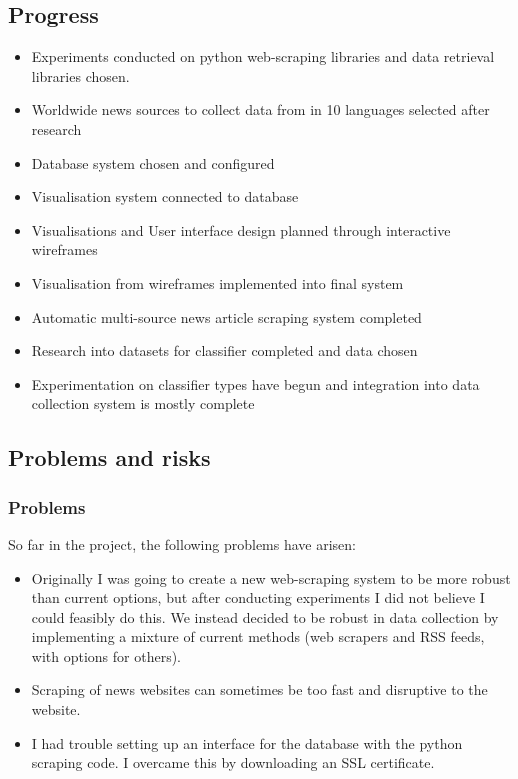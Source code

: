 \documentclass[11pt]{article}
\begin{document}
\subsection{Progress}\label{progress}
\begin{itemize}
    \tightlist
\item  Experiments conducted on python web-scraping libraries and data retrieval libraries chosen.
\item  Worldwide news sources to collect data from in 10 languages selected after research
\item  Database system chosen and configured
\item  Visualisation system connected to database
\item  Visualisations and User interface design planned through interactive wireframes
\item  Visualisation from wireframes implemented into final system
\item  Automatic multi-source news article scraping system completed
\item  Research into datasets for classifier completed and data chosen
\item  Experimentation on classifier types have begun and integration into data collection system is mostly complete
\end{itemize}

\subsection{Problems and risks}\label{problems-and-risks}

\subsubsection{Problems}\label{problems}
So far in the project, the following problems have arisen:
\begin{itemize}
    \tightlist
\item Originally I was going to create a new web-scraping system to be more robust than current options, but after conducting experiments I did not believe I could feasibly do this. We instead decided to be robust in data collection by implementing a mixture of current methods (web scrapers and RSS feeds, with options for others).
\item Scraping of news websites can sometimes be too fast and disruptive to the website.
\item I had trouble setting up an interface for the database with the python scraping code. I overcame this by downloading an SSL certificate.
\end{itemize}
\end{document}
